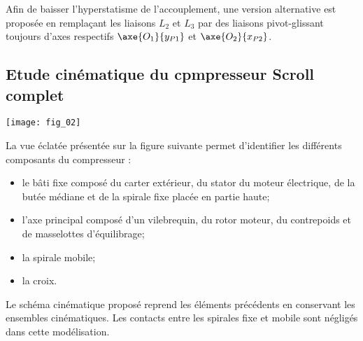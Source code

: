

Afin de baisser l’hyperstatisme de l’accouplement, une version alternative est proposée en 
remplaçant les liaisons $L_2$ et $L_3$ par des liaisons pivot-glissant toujours d’axes respectifs
$\axe{O_1}{y_{P1}}$ et $\axe{O_2}{x_{P2}}$.






\subsection*{Etude cinématique du cpmpresseur Scroll complet}

\begin{marginfigure}%
\texttt{[image: fig\_02]}
\end{marginfigure}

La vue éclatée présentée sur la figure suivante permet d’identifier les différents composants du compresseur :
\begin{itemize}
\item le bâti fixe composé du carter extérieur, du stator du moteur électrique, de la butée médiane et de la spirale fixe placée en partie haute;
\item l’axe principal composé d’un vilebrequin, du rotor moteur, du contrepoids et de masselottes d’équilibrage;
\item la spirale mobile;
\item la croix.
\end{itemize}




Le schéma cinématique proposé reprend les éléments précédents en 
conservant les ensembles cinématiques.
Les contacts entre les spirales fixe et mobile sont négligés dans cette modélisation.



